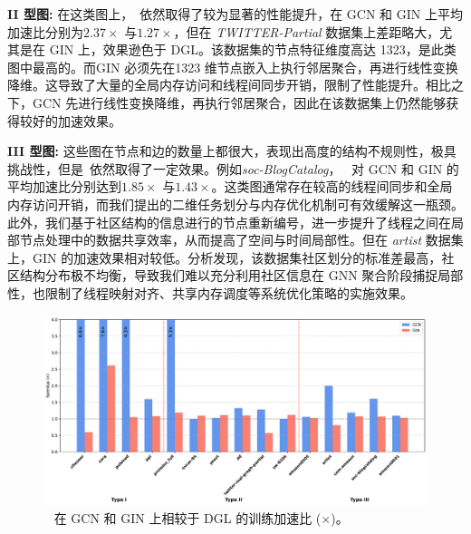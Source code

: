 \textbf{II 型图:}
在这类图上，~\Mname{}依然取得了较为显著的性能提升，在 GCN 和 GIN 上平均加速比分别为$2.37\times$ 与$1.27\times$，但在 \textit{TWITTER-Partial} 数据集上差距略大，尤其是在 GIN 上，效果逊色于 DGL。该数据集的节点特征维度高达 1323，是此类图中最高的。而GIN 必须先在1323 维节点嵌入上执行邻居聚合，再进行线性变换降维。这导致了大量的全局内存访问和线程间同步开销，限制了性能提升。相比之下，GCN 先进行线性变换降维，再执行邻居聚合，因此在该数据集上仍然能够获得较好的加速效果。

\textbf{III 型图:}
这些图在节点和边的数量上都很大，表现出高度的结构不规则性，极具挑战性，但是~\Mname{}依然取得了一定效果。例如\textit{soc-BlogCatalog}，~\Mname{} 对 GCN 和 GIN 的平均加速比分别达到$1.85\times$ 与$1.43\times$。这类图通常存在较高的线程间同步和全局内存访问开销，而我们提出的二维任务划分与内存优化机制可有效缓解这一瓶颈。此外，我们基于社区结构的信息进行的节点重新编号，进一步提升了线程之间在局部节点处理中的数据共享效率，从而提高了空间与时间局部性。但在 \textit{artist} 数据集上，GIN 的加速效果相对较低。分析发现，该数据集社区划分的标准差最高，社区结构分布极不均衡，导致我们难以充分利用社区信息在 GNN 聚合阶段捕捉局部性，也限制了线程映射对齐、共享内存调度等系统优化策略的实施效果。
\begin{figure}[htbp] 
    \centering
    \includegraphics[width=0.9\linewidth]{images/dgl_train_cmp.pdf} 
    \caption{~\Mname{} 在 GCN 和 GIN 上相较于 DGL 的训练加速比 ($\times$)。}
    \label{fig: Speedup vs DGL Training}
    \setlength{\abovecaptionskip}{0.4cm} %
    \setlength{\belowcaptionskip}{-0.4cm} %
\end{figure}

